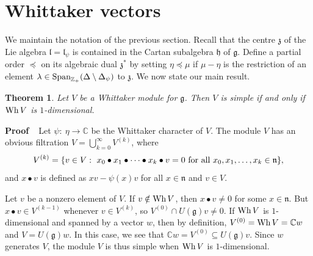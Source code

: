 \documentclass[11pt]{article}
\newtheorem{theorem}[equation]{Theorem}
\numberwithin{equation}{section}
\newcommand{\fg}{\mathfrak{g}}
\newcommand{\proof}{{\bf Proof\ \ }}
\begin{document}
\section{Whittaker vectors}

We maintain the notation of the previous section.  Recall that the centre $\mathfrak{z}$ of the Lie algebra $\mathfrak{l}=\mathfrak{l}_\psi$ is contained in the Cartan subalgebra $\mathfrak{h}$ of $\mathfrak{g}$.  Define a partial order $\preceq$ on its algebraic dual $\mathfrak{z}^*$ by setting $\eta\preceq\mu$ if $\mu-\eta$ is the restriction of an element $\lambda\in\hbox{Span}_{\mathbb{Z}_+}(\Delta\setminus\Delta_\psi)$ to $\mathfrak{z}$.  We now state our main result.
  \begin{theorem}\label{mainthm}
Let $V$ be a Whittaker module for $\fg$.  Then $V$ is simple if and only if $\hbox{Wh}\,V$ is $1$-dimensional.
    \end{theorem}

  \noindent
  \proof Let $\psi:\ \eta\rightarrow\mathbb{C}$ be the Whittaker character of $V$.  The module $V$ has an obvious filtration $V=\bigcup_{k=0}^\infty V^{(k)}$, where
  $$V^{(k)}=\{v\in V:\ x_0\bullet x_1\bullet\cdots\bullet x_k\bullet v=0\hbox{\ for all\ }x_0,x_1,\ldots ,x_k\in\mathfrak{n}\},$$
  and $x\bullet v$ is defined as $xv-\psi(x)v$ for all $x\in\mathfrak{n}$ and $v\in V$. 

  Let $v$ be a nonzero element of $V$.  If $v\notin\hbox{Wh}\,V$, then $x\bullet v\neq0$ for some $x\in\mathfrak{n}$.  But $x\bullet v\in V^{(k-1)}$ whenever $v\in V^{(k)}$, so $V^{(0)}\cap U(\fg)v\neq 0$.   If $\hbox{Wh}\,V$ is $1$-dimensional and spanned by a vector $w$, then by definition, $V^{(0)}=\hbox{Wh}\,V=\mathbb{C}w$ and $V=U(\mathfrak{g})w$.  In this case, we see that $\mathbb{C}w= V^{(0)}\subseteq U(\fg)v$.  Since $w$ generates $V$, the module $V$ is thus simple when $\hbox{Wh}\,V$ is $1$-dimensional.
\end{document}
